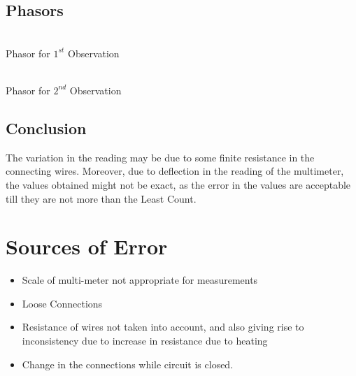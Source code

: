 \documentclass{article}
\begin{document}
\subsection{Phasors}
\begin{multicols}{2}
\begin{center}
 \\ \vspace{5px}
Phasor for $1^{st}$ Observation  \\

\columnbreak

 \\ \vspace{5px}
Phasor for $2^{nd}$ Observation
\end{center}
\end{multicols}

\subsection{Conclusion}
The variation in the reading may be due to some finite resistance in the connecting wires. Moreover, due to deflection in the reading of the multimeter, the values obtained might not be exact, as the error in the values are acceptable till they are not more than the Least Count.

\vspace{10px}
\section{Sources of Error}
\begin{itemize}
\item Scale of multi-meter not appropriate for measurements
\item Loose Connections
\item Resistance of wires not taken into account, and also giving rise to inconsistency due to increase in resistance due to heating
\item Change in the connections while circuit is closed.

\end{itemize}
\end{document}
